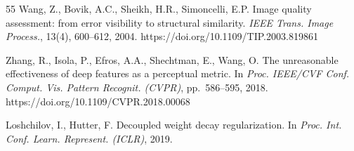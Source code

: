 \documentclass[lettersize,journal]{IEEEtran}
\begin{document}
\begin{thebibliography}{55}
Wang, Z., Bovik, A.C., Sheikh, H.R., Simoncelli, E.P. Image quality assessment: from error visibility to structural similarity. \textit{IEEE Trans. Image Process.}, 13(4), 600--612, 2004. https://doi.org/10.1109/TIP.2003.819861

Zhang, R., Isola, P., Efros, A.A., Shechtman, E., Wang, O. The unreasonable effectiveness of deep features as a perceptual metric. In \textit{Proc. IEEE/CVF Conf. Comput. Vis. Pattern Recognit. (CVPR)}, pp.~586--595, 2018. https://doi.org/10.1109/CVPR.2018.00068

Loshchilov, I., Hutter, F. Decoupled weight decay regularization. In \textit{Proc. Int. Conf. Learn. Represent. (ICLR)}, 2019.

\end{thebibliography}
\end{document}
